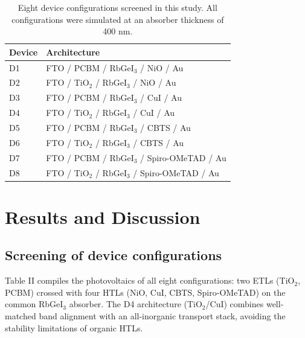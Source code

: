 \documentclass[review]{elsarticle}
\begin{document}
\begin{table}[htbp]
\centering
{\small\setlength{\tabcolsep}{3pt}
\begin{tabularx}{\textwidth}{XX}
\hline
Device & Architecture
\\\hline
D1 & FTO / PCBM / RbGeI$_{3}$ / NiO / Au\\
D2 & FTO / TiO$_{2}$ / RbGeI$_{3}$ / NiO / Au\\
D3 & FTO / PCBM / RbGeI$_{3}$ / CuI / Au\\
D4 & FTO / TiO$_{2}$ / RbGeI$_{3}$ / CuI / Au\\
D5 & FTO / PCBM / RbGeI$_{3}$ / CBTS / Au\\
D6 & FTO / TiO$_{2}$ / RbGeI$_{3}$ / CBTS / Au\\
D7 & FTO / PCBM / RbGeI$_{3}$ / Spiro-OMeTAD / Au\\
D8 & FTO / TiO$_{2}$ / RbGeI$_{3}$ / Spiro-OMeTAD / Au\\
\hline
\end{tabularx}
}
\caption{Eight device configurations screened in this study. All configurations were simulated at an absorber thickness of 400 nm.}
\end{table}

\section{Results and Discussion}

\subsection{Screening of device configurations}
Table II compiles the photovoltaics of all eight configurations: two ETLs (TiO$_{2}$, PCBM) crossed with four HTLs (NiO, CuI, CBTS, Spiro-OMeTAD) on the common RbGeI$_{3}$ absorber.
The D4 architecture (TiO$_{2}$/CuI) combines well-matched band alignment with an all-inorganic transport stack, avoiding the stability limitations of organic HTLs.
\end{document}
